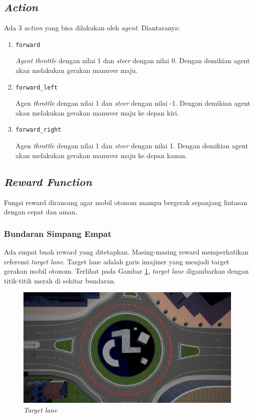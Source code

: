 \documentclass[conference]{IEEEtran}
\begin{document}
\subsection{\textit{Action}}
\label{sec:action}
Ada 3 \textit{action} yang bisa dilakukan oleh \textit{agent}. Diantaranya:

\begin{enumerate}
	\item \verb=forward=
	
	\textit{Agent} \textit{throttle} dengan nilai 1 dan \textit{steer} dengan nilai 0. Dengan demikian agent akan melakukan gerakan manuver maju.
	
	\item \verb=forward_left=
	
	Agen \textit{throttle} dengan nilai 1 dan \textit{steer} dengan nilai -1. Dengan demikian agent akan melakukan gerakan manuver maju ke depan kiri.
	
	\item \verb=forward_right=
	
	Agen \textit{throttle} dengan nilai 1 dan \textit{steer} dengan nilai 1. Dengan demikian agent akan melakukan gerakan manuver maju ke depan kanan.
	
\end{enumerate}

\subsection{\textit{Reward Function}}
\label{sec:sistem_reward}

Fungsi reward dirancang agar mobil otonom mampu bergerak sepanjang lintasan dengan cepat dan aman.

\subsubsection{Bundaran Simpang Empat}Ada empat buah reward yang ditetapkan. Masing-masing reward memperhatikan referensi \textit{target lane}. Target lane adalah garis imajiner yang menjadi target gerakan mobil otonom. Terlihat pada Gambar \ref{fig:target_lane_line}, \textit{target lane} digambarkan dengan titik-titik merah di sekitar bundaran.

\begin{figure}[H] 
	\centering
	\includegraphics[width=1\linewidth]{images/target_lane_line}
	\caption{\textit{Target lane}}
	\label{fig:target_lane_line}
\end{figure}
\end{document}
